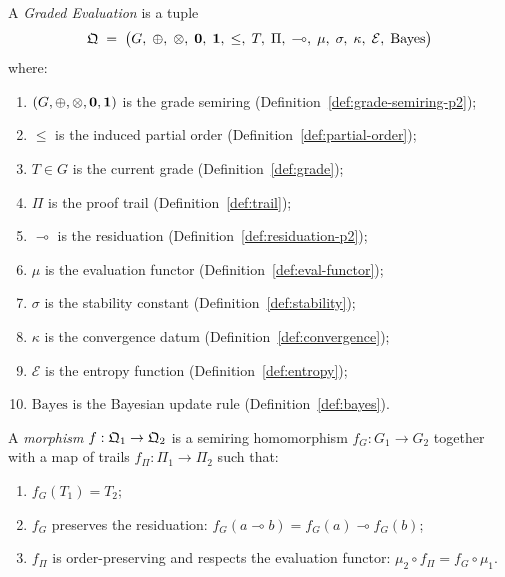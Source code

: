\begin{definition}
\label{def:geval}
A \emph{Graded Evaluation} is a tuple
\[
  \mathfrak{Q} \;=\;
  \bigl(G,\; \oplus,\; \otimes,\; \mathbf{0},\; \mathbf{1},\;
  {\leq},\; T,\; \Pi,\; {\multimap},\;
  \mu,\; \sigma,\; \kappa,\; \mathcal{E},\;
  \mathrm{Bayes}\bigr)
\]
where:
\begin{enumerate}[label=(\roman*),nosep]
\item $(G, \oplus, \otimes, \mathbf{0}, \mathbf{1})$ is the grade semiring
  (Definition~\ref{def:grade-semiring-p2});
\item $\leq$ is the induced partial order
  (Definition~\ref{def:partial-order});
\item $T \in G$ is the current grade (Definition~\ref{def:grade});
\item $\Pi$ is the proof trail (Definition~\ref{def:trail});
\item $\multimap$ is the residuation
  (Definition~\ref{def:residuation-p2});
\item $\mu$ is the evaluation functor
  (Definition~\ref{def:eval-functor});
\item $\sigma$ is the stability constant
  (Definition~\ref{def:stability});
\item $\kappa$ is the convergence datum
  (Definition~\ref{def:convergence});
\item $\mathcal{E}$ is the entropy function
  (Definition~\ref{def:entropy});
\item $\mathrm{Bayes}$ is the Bayesian update rule
  (Definition~\ref{def:bayes}).
\end{enumerate}
\end{definition}

\begin{definition}
\label{def:geval-morph}
A \emph{morphism} $f : \mathfrak{Q}_1 \to \mathfrak{Q}_2$ is a semiring
homomorphism $f_G : G_1 \to G_2$ together with a map of trails
$f_\Pi : \Pi_1 \to \Pi_2$ such that:
\begin{enumerate}[label=(\alph*),nosep]
\item $f_G(T_1) = T_2$;
\item $f_G$ preserves the residuation:
  $f_G(a \multimap b) = f_G(a) \multimap f_G(b)$;
\item $f_\Pi$ is order-preserving and respects the evaluation functor:
  $\mu_2 \circ f_\Pi = f_G \circ \mu_1$.
\end{enumerate}
\end{definition}

